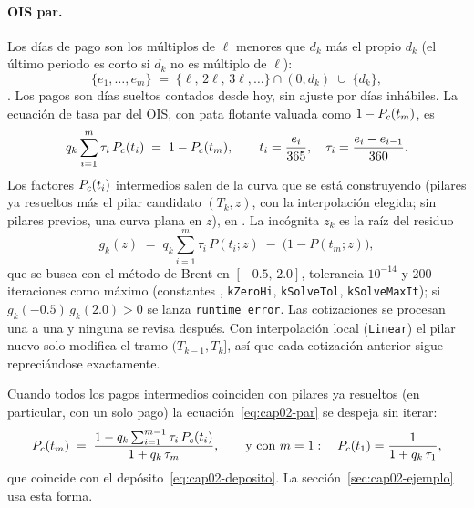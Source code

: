 \paragraph{OIS par.} Los días de pago son los múltiplos de $\ell$ menores que $d_k$ más el propio $d_k$
(el último periodo es corto si $d_k$ no es múltiplo de $\ell$):
\begin{equation}\label{eq:cap02-dias-pago}
  \{e_1,\dots,e_m\} \;=\; \{\ell,\,2\ell,\,3\ell,\dots\}\cap(0,d_k)\;\cup\;\{d_k\},
\end{equation}
. Los pagos son días sueltos contados desde hoy, sin
ajuste por días inhábiles. La ecuación de tasa par del OIS, con pata flotante valuada como $1-P_{c}(t_m)$, es
\begin{equation}\label{eq:cap02-par}
  q_k\sum_{i=1}^{m}\tau_i\,P_{c}(t_i) \;=\; 1 - P_{c}(t_m),
  \qquad t_i = \frac{e_i}{365},\quad \tau_i = \frac{e_i-e_{i-1}}{360}.
\end{equation}
Los factores $P_{c}(t_i)$ intermedios salen de la curva que se está construyendo (pilares ya resueltos más el
pilar candidato $(T_k,z)$, con la interpolación elegida; sin pilares previos, una curva plana en $z$), en
. La incógnita $z_k$ es la raíz del residuo
\begin{equation}\label{eq:cap02-residuo}
  g_k(z) \;=\; q_k\sum_{i=1}^{m}\tau_i\,P(t_i;z) \;-\; \bigl(1 - P(t_m;z)\bigr),
\end{equation}
que se busca con el método de Brent en $[-0.5,\,2.0]$, tolerancia $10^{-14}$ y 200 iteraciones como máximo
(constantes , \texttt{kZeroHi}, \texttt{kSolveTol},
\texttt{kSolveMaxIt}); si $g_k(-0.5)\,g_k(2.0)>0$ se lanza \texttt{runtime\_error}. Las cotizaciones se procesan
una a una y ninguna se revisa después. Con interpolación local (\texttt{Linear}) el pilar nuevo solo modifica el
tramo $(T_{k-1},T_k]$, así que cada cotización anterior sigue repreciándose exactamente.

Cuando todos los pagos intermedios coinciden con pilares ya resueltos (en particular, con un solo pago) la
ecuación~\eqref{eq:cap02-par} se despeja sin iterar:
\begin{equation}\label{eq:cap02-cerrada}
  P_{c}(t_m) \;=\; \frac{1 - q_k\sum_{i=1}^{m-1}\tau_i\,P_{c}(t_i)}{1 + q_k\,\tau_m},
  \qquad\text{y con } m=1:\quad P_{c}(t_1) = \frac{1}{1+q_k\,\tau_1},
\end{equation}
que coincide con el depósito~\eqref{eq:cap02-deposito}. La sección~\ref{sec:cap02-ejemplo} usa esta forma.

